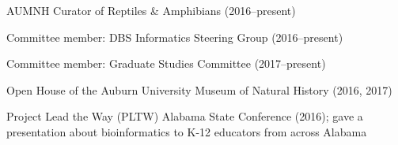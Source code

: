 \begin{tightItemize}
    \item AUMNH Curator of Reptiles \& Amphibians (2016--present)
    \item Committee member: DBS Informatics Steering Group (2016--present)
    \item Committee member: Graduate Studies Committee (2017--present)
    \item Open House of the Auburn University Museum of Natural History (2016, 2017)
    \item Project Lead the Way (PLTW) Alabama State Conference (2016); gave a
        presentation about bioinformatics to K-12 educators from across Alabama
\end{tightItemize}
